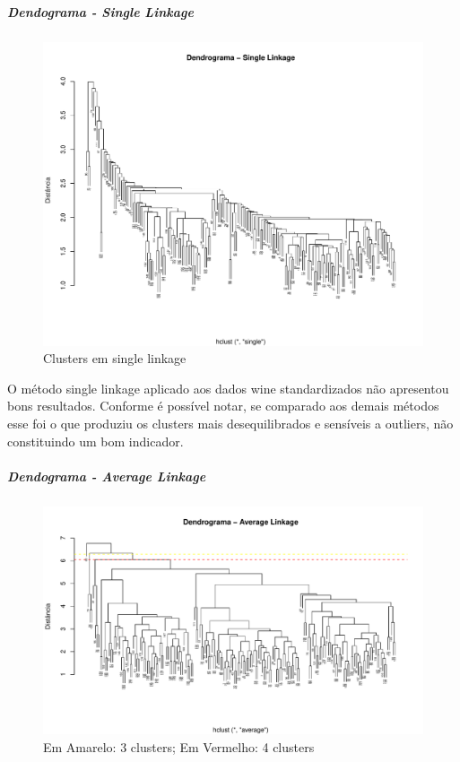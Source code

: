 \documentclass[
  letterpaper,
  DIV=11,
  numbers=noendperiod]{scrartcl}
\let\oldsubparagraph\subparagraph
\renewcommand{\subparagraph}[1]{\oldsubparagraph{#1}\mbox{}}
\begin{document}
\subparagraph{Dendograma - Single
Linkage}\label{dendograma---single-linkage}

\begin{figure}[H]

{\centering \includegraphics{wines_analysis_files/figure-pdf/unnamed-chunk-38-1.pdf}

}

\caption{Clusters em single linkage}

\end{figure}%

O método single linkage aplicado aos dados wine standardizados não
apresentou bons resultados. Conforme é possível notar, se comparado aos
demais métodos esse foi o que produziu os clusters mais desequilibrados
e sensíveis a outliers, não constituindo um bom indicador.

\newpage{}

\subparagraph{Dendograma - Average
Linkage}\label{dendograma---average-linkage}

\begin{figure}[H]

{\centering \includegraphics{wines_analysis_files/figure-pdf/unnamed-chunk-39-1.pdf}

}

\caption{Em Amarelo: 3 clusters; Em Vermelho: 4 clusters}

\end{figure}%
\end{document}

